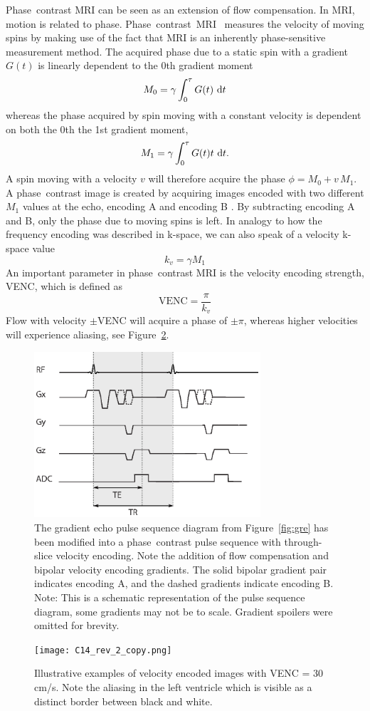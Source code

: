 Phase~contrast MRI can be seen as an extension of flow compensation. In MRI, motion is related to phase. 
Phase~contrast~MRI~\cite{Moran1982, Moran1985} measures the velocity of moving spins by making use of the fact that MRI is an inherently phase-sensitive measurement method. The acquired phase due to a static spin with a gradient $G(t)$ is linearly dependent to the 0th gradient moment
\begin{equation}
    M_0 = \gamma \int_0^\tau G(t)\,\dif t
\end{equation}
whereas the phase acquired by spin moving with a constant velocity is dependent on both the 0th the 1st gradient moment,
\begin{equation}
    M_1 = \gamma \int_0^\tau G(t)t\,\dif t. 
\end{equation}
A spin moving with a velocity $v$ will therefore acquire the phase
$\phi = M_0 + v\, M_1$. A phase~contrast image is created by acquiring images encoded with two different $M_1$ values at the echo, encoding A and encoding B \cite{VanDijk1984,Bryant1984}. By subtracting encoding A and B, only the phase due to moving spins is left. In analogy to how the frequency encoding was described in k-space, we can also speak of a velocity k-space value
\begin{equation}
    k_v = \gamma M_1
\end{equation}
An important parameter in phase~contrast MRI is the velocity encoding strength, VENC, which is defined as
\begin{equation}
    \textrm{VENC} = \frac{\pi}{k_v}
\end{equation}
Flow with velocity $\pm$VENC will acquire a phase of $\pm\pi$, whereas higher velocities will experience aliasing, see Figure~\ref{fig:venc}.
\begin{figure}[htbp]
    \centering
    \includegraphics[width=0.75\textwidth]{img/pc3-01.eps}
\caption{The gradient echo pulse sequence diagram from Figure~\ref{fig:gre} has been modified into a phase~contrast pulse sequence with through-slice velocity encoding. Note the addition of flow compensation and bipolar velocity encoding gradients. The solid bipolar gradient pair indicates encoding A, and the dashed gradients indicate encoding B. Note: This is a schematic representation of the pulse sequence diagram, some gradients may not be to scale. Gradient spoilers were omitted for brevity.}
    \label{fig:pc2}
\end{figure}
\begin{figure}[htbp]
    \centering
    \texttt{[image: C14\_rev\_2\_copy.png]}
\caption{Illustrative examples of velocity encoded images with VENC = 30 cm/s. Note the aliasing in the left ventricle which is visible as a distinct border between black and white. }
    \label{fig:venc}
\end{figure}
